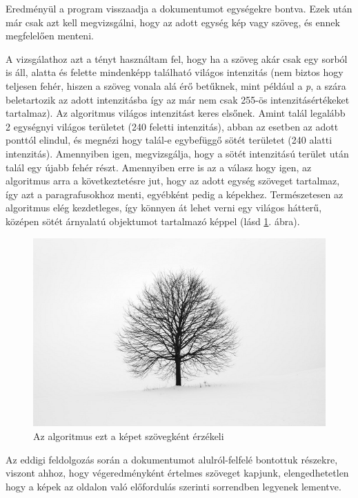 Eredményül a program visszaadja a dokumentumot egységekre bontva. Ezek után már csak azt kell megvizsgálni, hogy az adott egység kép vagy szöveg, és ennek megfelelően menteni.


A vizsgálathoz azt a tényt használtam fel, hogy ha a szöveg akár csak egy sorból is áll, alatta és felette mindenképp található világos intenzitás (nem biztos hogy teljesen fehér, hiszen a szöveg vonala alá érő betűknek, mint például a \emph{p}, a szára beletartozik az adott intenzitásba így az már nem csak 255-ös intenzitásértékeket tartalmaz). Az algoritmus világos intenzitást keres elsőnek. Amint talál legalább 2 egységnyi világos területet (240 feletti intenzitás), abban az esetben az adott ponttól elindul, és megnézi hogy talál-e egybefüggő sötét területet (240 alatti intenzitás). Amennyiben igen, megvizsgálja, hogy a sötét intenzitású terület után talál egy újabb fehér részt. Amennyiben erre is az a válasz hogy igen, az algoritmus arra a következtetésre jut, hogy az adott egység szöveget tartalmaz, így azt a paragrafusokhoz menti, egyébként pedig a képekhez. Természetesen az algoritmus elég kezdetleges, így könnyen át lehet verni egy világos hátterű, középen sötét árnyalatú objektumot tartalmazó képpel (lásd \ref{fig:tree}. ábra).

\begin{figure}[H]
\centering
\includegraphics[scale=1]{images/tree.png}
\caption{Az algoritmus ezt a képet szövegként érzékeli}
\label{fig:tree}
\end{figure}

Az eddigi feldolgozás során a dokumentumot alulról-felfelé bontottuk részekre, viszont ahhoz, hogy végeredményként értelmes szöveget kapjunk, elengedhetetlen hogy a képek az oldalon való előfordulás szerinti sorrendben legyenek lementve.

